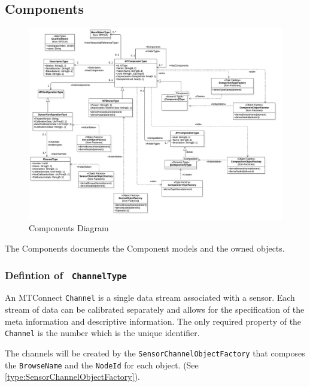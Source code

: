 \subsection{Components}

\begin{figure}
  \centering
    \includegraphics[width=1.0\textwidth]{diagrams/Components.png}
  \caption{Components Diagram}
  \label{fig:Components}
\end{figure}

\FloatBarrier


The Components documents the Component models and the owned objects.

\subsubsection{Defintion of \texttt{ ChannelType}} \label{type:ChannelType}

\FloatBarrier

An MTConnect \texttt{Channel} is a single data stream associated with a sensor. Each stream
of data can be calibrated separately and allows for the specification of the meta information
and descriptive information. The only required property of the \texttt{Channel} is the number
which is the unique identifier.

The channels will be created by the \texttt{SensorChannelObjectFactory} that composes the \texttt{BrowseName} 
and the \texttt{NodeId} for each object. (See \ref{type:SensorChannelObjectFactory}).

